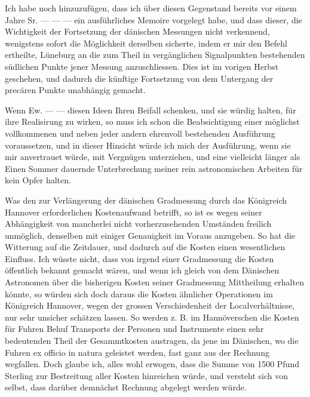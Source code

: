 \par
{}%
Ich habe noch hinzuzufügen, dass ich über diesen Gegenstand bereits vor einem Jahre Sr. — — — ein ausführliches Memoire vorgelegt habe, und dass dieser, die Wichtigkeit der Fortsetzung der dänischen Messungen nicht verkennend, wenigstens sofort die Möglichkeit derselben sicherte, indem er mir den Befehl ertheilte, Lüneburg an die zum Theil in vergänglichen Signalpunkten bestehenden südlichen Punkte jener Messung anzuschliessen. Dies ist im vorigen Herbst geschehen, und dadurch die künftige Fortsetzung von dem Untergang der precären Punkte unabhängig gemacht.

Wenn Ew. — — diesen Ideen Ihren Beifall schenken, und sie würdig halten, für ihre Realisirung zu wirken, so muss ich schon die Beabsichtigung einer möglichst vollkommenen und neben jeder andern ehrenvoll bestehenden Ausführung voraussetzen, und in dieser Hinsicht würde ich mich der Ausführung, wenn sie mir anvertrauet würde, mit Vergnügen unterziehen, und eine vielleicht länger als Einen Sommer dauernde Unterbrechung meiner rein astronomischen Arbeiten für kein Opfer halten.

Was den zur Verlängerung der dänischen Gradmessung durch das Königreich Hannover erforderlichen Kostenaufwand betrifft, so ist es wegen seiner Abhängigkeit von mancherlei nicht vorherzusehenden Umständen freilich unmöglich, denselben mit einiger Genauigkeit im Voraus anzugeben. So hat die Witterung auf die Zeitdauer, und dadurch auf die Kosten einen wesentlichen Einfluss. Ich wüsste nicht, dass von irgend einer Gradmessung die Kosten öffentlich bekannt gemacht wären, und wenn ich gleich von dem Dänischen Astronomen über die bisherigen Kosten seiner Gradmessung Mittheilung erhalten könnte, so würden sich doch daraus die Kosten ähnlicher Operationen im Königreich Hannover, wegen der grossen Verschiedenheit der Localverhältnisse, nur sehr unsicher schätzen lassen. So werden z. B. im Hannöverschen die Kosten für Fuhren Behuf Transports der Personen und Instrumente einen sehr bedeutenden Theil der Gesammtkosten austragen, da jene im Dänischen, wo die Fuhren ex officio in natura geleistet werden, fast ganz aus der Rechnung wegfallen. Doch glaube ich, alles wohl erwogen, dass die Summe von 1500 Pfund Sterling zur Bestreitung aller Kosten hinreichen würde, und versteht sich von selbst, dass darüber demnächst Rechnung abgelegt werden würde.

